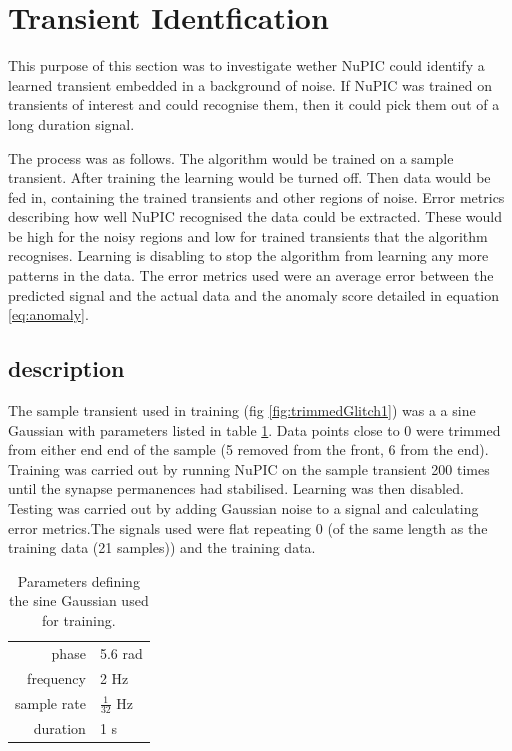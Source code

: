\documentclass[a4paper]{jpconf}
\begin{document}
\section{Transient Identfication}
	This purpose of this section was to investigate wether NuPIC could identify a learned transient embedded in a background of noise. If NuPIC was trained on transients of interest and could recognise them, then it could pick them out of a long duration signal.
	
		The process was as follows. The algorithm would be trained on a sample transient. After training the learning would be turned off. Then data would be fed in, containing the trained transients and other regions of noise. Error metrics describing how well NuPIC recognised the data could be extracted. These would be high for the noisy regions and low for trained transients that the algorithm recognises. Learning is disabling to stop the algorithm from learning any more patterns in the data. The error metrics used were an average error between the predicted signal and the actual data and the anomaly score detailed in equation \ref{eq:anomaly}.
		
	\subsection{description\label{experimentDescription}}
		The sample transient used in training (fig \ref{fig:trimmedGlitch1}) was a a sine Gaussian with parameters listed in table \ref{tab:sg}. Data points close to 0 were trimmed from either end end of the sample (5 removed from the front, 6 from the end). Training was carried out by running NuPIC on the sample transient 200 times until the synapse permanences had stabilised. Learning was then disabled. Testing was carried out by adding Gaussian noise to a signal and calculating error metrics.The signals used were flat repeating 0 (of the same length as the training data (21 samples)) and the training data.
		\begin{table}
			\centering
			\begin{tabular}{r l}
				phase& 5.6 rad\\
				frequency& 2 Hz\\
				sample rate& $\frac{1}{32}$ Hz\\
				duration& 1 s\\
			\end{tabular}
			\caption{\label{tab:sg}Parameters defining the sine Gaussian used for training.}
		\end{table}
		
\end{document}

